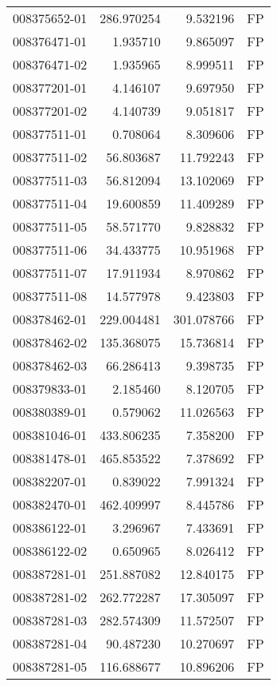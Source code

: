\begin{tabular}{lrrl}
008375652-01 &  286.970254 &     9.532196 &   FP \\
008376471-01 &    1.935710 &     9.865097 &   FP \\
008376471-02 &    1.935965 &     8.999511 &   FP \\
008377201-01 &    4.146107 &     9.697950 &   FP \\
008377201-02 &    4.140739 &     9.051817 &   FP \\
008377511-01 &    0.708064 &     8.309606 &   FP \\
008377511-02 &   56.803687 &    11.792243 &   FP \\
008377511-03 &   56.812094 &    13.102069 &   FP \\
008377511-04 &   19.600859 &    11.409289 &   FP \\
008377511-05 &   58.571770 &     9.828832 &   FP \\
008377511-06 &   34.433775 &    10.951968 &   FP \\
008377511-07 &   17.911934 &     8.970862 &   FP \\
008377511-08 &   14.577978 &     9.423803 &   FP \\
008378462-01 &  229.004481 &   301.078766 &   FP \\
008378462-02 &  135.368075 &    15.736814 &   FP \\
008378462-03 &   66.286413 &     9.398735 &   FP \\
008379833-01 &    2.185460 &     8.120705 &   FP \\
008380389-01 &    0.579062 &    11.026563 &   FP \\
008381046-01 &  433.806235 &     7.358200 &   FP \\
008381478-01 &  465.853522 &     7.378692 &   FP \\
008382207-01 &    0.839022 &     7.991324 &   FP \\
008382470-01 &  462.409997 &     8.445786 &   FP \\
008386122-01 &    3.296967 &     7.433691 &   FP \\
008386122-02 &    0.650965 &     8.026412 &   FP \\
008387281-01 &  251.887082 &    12.840175 &   FP \\
008387281-02 &  262.772287 &    17.305097 &   FP \\
008387281-03 &  282.574309 &    11.572507 &   FP \\
008387281-04 &   90.487230 &    10.270697 &   FP \\
008387281-05 &  116.688677 &    10.896206 &   FP \\

\end{tabular}
